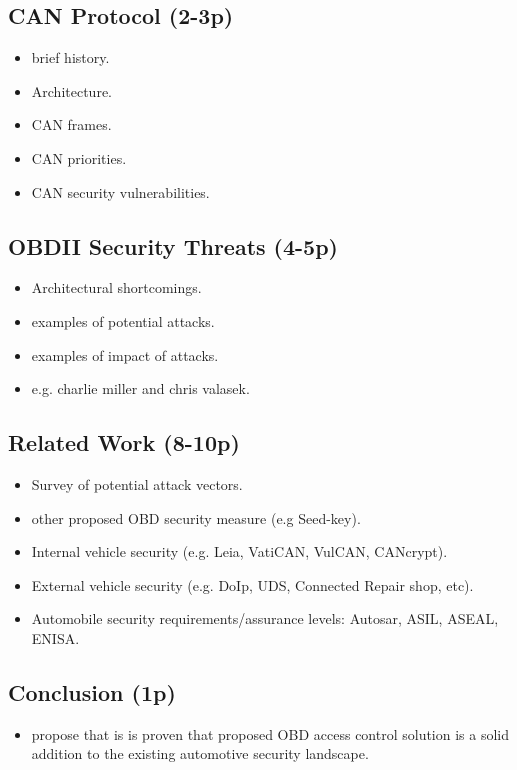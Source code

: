 \documentclass[11pt]{article}
\begin{document}
\subsection{CAN Protocol (2-3p)}
\begin{itemize}
	\item brief history.
	\item Architecture.
	\item CAN frames.
	\item CAN priorities.
	\item CAN security vulnerabilities.
\end{itemize}

\subsection{OBDII Security Threats (4-5p)}
\begin{itemize}
	\item Architectural shortcomings.
	\item examples of potential attacks.
	\item examples of impact of attacks.
	\item e.g. charlie miller and chris valasek.
\end{itemize}

\subsection{Related Work (8-10p)}
\begin{itemize}
	\item Survey of potential attack vectors.
	\item other proposed OBD security measure (e.g Seed-key).
	\item Internal vehicle security (e.g. Leia, VatiCAN, VulCAN, CANcrypt).
	\item External vehicle security (e.g. DoIp, UDS, Connected Repair shop, etc).
	\item Automobile security requirements/assurance levels: Autosar, ASIL, ASEAL, ENISA. 
\end{itemize}

\subsection{Conclusion (1p)}
\begin{itemize}
	\item propose that is is proven that proposed OBD access control solution is a solid addition to the existing automotive security landscape.
\end{itemize}
\end{document}
